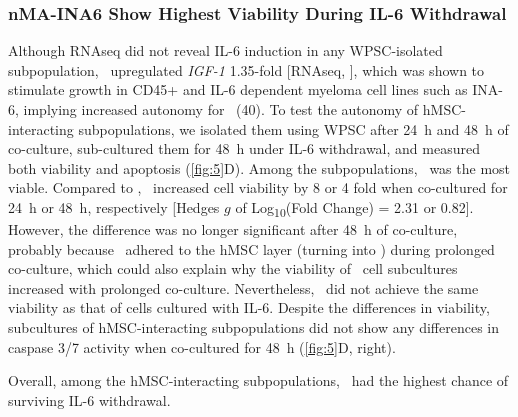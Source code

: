 \subsubsection*{nMA-INA6 Show Highest Viability During IL-6 Withdrawal}%
\label{C1:results:RNAseq:viability}%
Although RNAseq did not reveal IL-6 induction in any WPSC-isolated
subpopulation, \nMAina\ upregulated \textit{IGF-1} 1.35-fold [RNAseq,
], which was shown to stimulate growth in CD45+ and IL-6
dependent myeloma cell lines such as INA-6, implying increased autonomy for
\nMAina\ (40). To test the autonomy of hMSC-interacting \INA subpopulations, we
isolated them using WPSC after \SI{24}{\hour} and \SI{48}{\hour} of co-culture,
sub-cultured them for \SI{48}{\hour} under IL-6 withdrawal, and measured both
viability and apoptosis (\autoref{fig:5}D). Among the subpopulations, \nMAina\
was the most viable. Compared to \MAina, \nMAina\ increased cell viability by 8
or 4 fold when co-cultured for \SI{24}{\hour} or \SI{48}{\hour}, respectively
    [Hedges $g$ of Log\textsubscript{10}(Fold Change) = 2.31 or 0.82]. However, the
difference was no longer significant after \SI{48}{\hour} of co-culture,
probably because \nMAina\ adhered to the hMSC layer (turning into \MAina) during
prolonged co-culture, which could also explain why the viability of \MAina\ cell
subcultures increased with prolonged co-culture. Nevertheless, \nMAina\ did not
achieve the same viability as that of \INA cells cultured with IL-6. Despite the
differences in viability, subcultures of hMSC-interacting subpopulations did not
show any differences in caspase 3/7 activity when co-cultured for \SI{48}{\hour}
(\autoref{fig:5}D, right).

Overall, among the hMSC-interacting subpopulations, \nMAina\ had the highest
chance of surviving IL-6 withdrawal.




